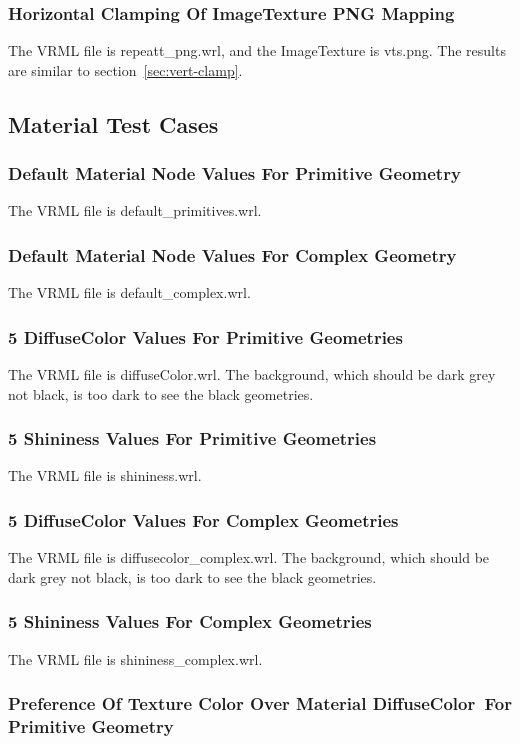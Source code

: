 \documentclass[12pt,letterpaper]{article}
\newcommand{\ITAH}{Horizontal Clamping Of ImageTexture PNG Mapping}
\newcommand{\MatA}{Default Material Node Values For Primitive Geometry}
\newcommand{\MatB}{Default Material Node Values For Complex Geometry}
\newcommand{\MatC}{5 DiffuseColor Values For Primitive Geometries}
\newcommand{\MatD}{5 Shininess Values For Primitive Geometries}
\newcommand{\MatE}{5 DiffuseColor Values For Complex Geometries}
\newcommand{\MatF}{5 Shininess Values For Complex Geometries}
\newcommand{\MatGa}{Preference Of Texture Color Over Material DiffuseColor~}
\newcommand{\MatGb}{For Primitive Geometry}
\begin{document}
\subsubsection{\ITAH}
The VRML file is repeatt\_png.wrl, and the ImageTexture is vts.png.\newline
The results are similar to section~\ref{sec:vert-clamp}.

\subsection{Material Test Cases}

\subsubsection{\MatA}
The VRML file is default\_primitives.wrl.

\subsubsection{\MatB}
The VRML file is default\_complex.wrl.

\subsubsection{\MatC}
The VRML file is diffuseColor.wrl.\newline
The background, which should be dark grey not black, is too dark to see the black geometries.

\subsubsection{\MatD}
The VRML file is shininess.wrl.

\subsubsection{\MatE}
The VRML file is diffusecolor\_complex.wrl.\newline
The background, which should be dark grey not black, is too dark to see the black geometries.

\subsubsection{\MatF}
The VRML file is shininess\_complex.wrl.

\subsubsection{\MatGa \MatGb}
\end{document}
